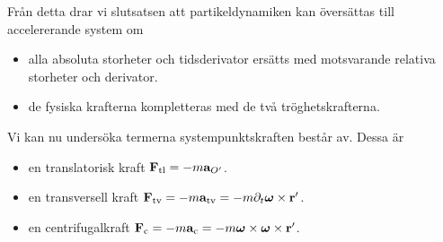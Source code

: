 Från detta drar vi slutsatsen att partikeldynamiken kan översättas till accelererande system om
\begin{itemize}
	\item alla absoluta storheter och tidsderivator ersätts med motsvarande relativa storheter och derivator.
	\item de fysiska krafterna kompletteras med de två tröghetskrafterna.
\end{itemize}

Vi kan nu undersöka termerna systempunktskraften består av. Dessa är
\begin{itemize}
	\item en translatorisk kraft $\vb{F}_{\text{tl}} = -m\vb{a}_{O'}$.
	\item en transversell kraft $\vb{F}_{\text{tv}} = -m\vb{a}_{\text{tv}} = -m\partial_{t}\vb*{\omega}\times\vb{r}'$.
	\item en centrifugalkraft $\vb{F}_{\text{c}} = -m\vb{a}_{\text{c}} = -m\vb*{\omega}\times\vb*{\omega}\times\vb{r}'$.
\end{itemize}